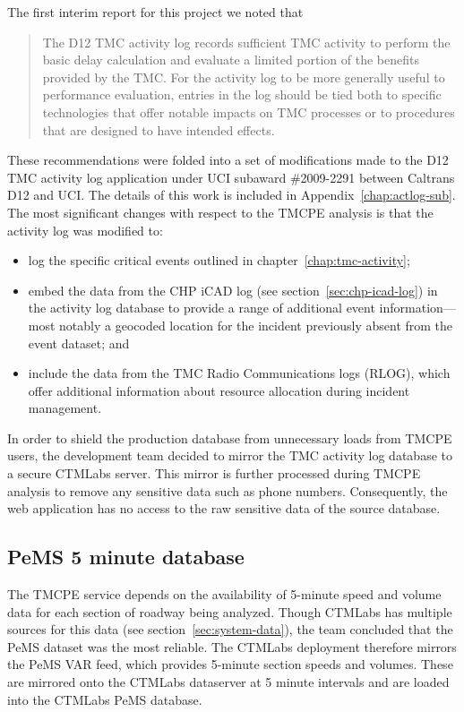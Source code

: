 \documentclass[12pt]{report}
\begin{document}
The first interim report for this project
\citep{rindt08:_measur_based_system_for_tmc_perfor_evaluat} we noted
that
\begin{quote}
  The \ac{D12} \ac{TMC} activity log records sufficient \ac{TMC} activity to
  perform the basic delay calculation and evaluate a limited portion of the
  benefits provided by the \ac{TMC}. For the activity log to be more generally
  useful to performance evaluation, entries in the log should be tied both to
  specific technologies that offer notable impacts on \ac{TMC} processes or to
  procedures that are designed to have intended effects.
\end{quote}
These recommendations were folded into a set of modifications made to the
\ac{D12} \ac{TMC} activity log application under UCI subaward \#2009-2291
between Caltrans \ac{D12} and UCI.  The details of this work is included in
Appendix~\ref{chap:actlog-sub}.  The most significant changes with respect to
the \ac{TMCPE} analysis is that the activity log was modified to:
\begin{itemize}
\item log the specific critical events outlined in
  chapter~\ref{chap:tmc-activity};
\item embed the data from the \ac{CHP} \ac{iCAD} log (see
  section~\ref{sec:chp-icad-log}) in the activity log database to
  provide a range of additional event information---most notably a
  geocoded location for the incident previously absent from the event
  dataset; and
\item include the data from the \ac{TMC} Radio Communications logs (RLOG),
  which offer additional information about resource allocation during
  incident management.
\end{itemize}

In order to shield the production database from unnecessary loads from
\ac{TMCPE} users, the development team decided to mirror the \ac{TMC} activity
log database to a secure \ac{CTMLabs} server.  This mirror is further processed
during \ac{TMCPE} analysis to remove any sensitive data such as phone numbers.
Consequently, the web application has no access to the raw sensitive data of the
source database.


\subsection{PeMS 5 minute database}
\label{sec:pems-5-min}

The \ac{TMCPE} service depends on the availability of 5-minute speed and volume
data for each section of roadway being analyzed.  Though \ac{CTMLabs} has
multiple sources for this data (see section~\ref{sec:system-data}), the team
concluded that the \ac{PeMS} dataset was the most reliable.  The \ac{CTMLabs}
deployment therefore mirrors the \ac{PeMS} \ac{VAR} feed, which provides
5-minute section speeds and volumes.  These are mirrored onto the \ac{CTMLabs}
dataserver at 5 minute intervals and are loaded into the \ac{CTMLabs} \ac{PeMS}
database.
\end{document}
